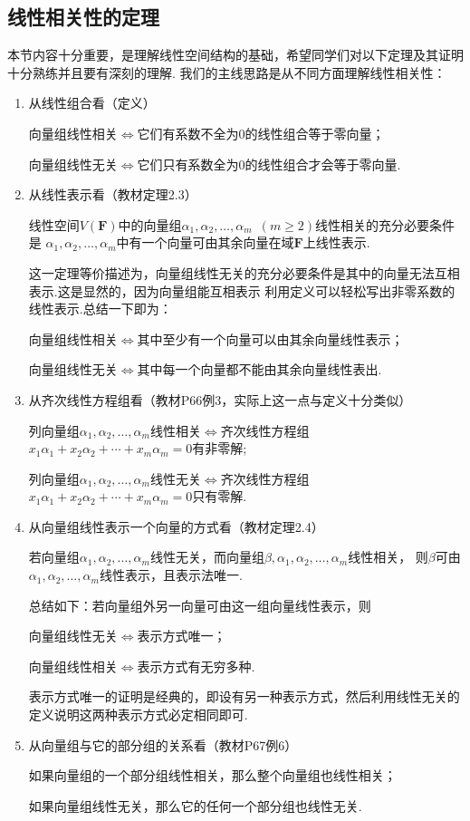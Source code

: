 \subsection{线性相关性的定理}
本节内容十分重要，是理解线性空间结构的基础，希望同学们对以下定理及其证明十分熟练并且要有深刻的理解.
我们的主线思路是从不同方面理解线性相关性：
\begin{enumerate}
    \item 从线性组合看（定义）

          向量组线性相关$\iff$它们有系数不全为0的线性组合等于零向量；

          向量组线性无关$\iff$它们只有系数全为0的线性组合才会等于零向量.
    \item 从线性表示看（教材定理2.3）
          \begin{theorem}
              线性空间$V(\mathbf{F})$中的向量组$\alpha_1,\alpha_2,\ldots,\alpha_m\enspace(m \geqslant 2)$线性相关的充分必要条件是
              $\alpha_1,\alpha_2,\ldots,\alpha_m$中有一个向量可由其余向量在域$\mathbf{F}$上线性表示.
          \end{theorem}
          这一定理等价描述为，向量组线性无关的充分必要条件是其中的向量无法互相表示.这是显然的，因为向量组能互相表示
          利用定义可以轻松写出非零系数的线性表示.总结一下即为：

          向量组线性相关$\iff$其中至少有一个向量可以由其余向量线性表示；

          向量组线性无关$\iff$其中每一个向量都不能由其余向量线性表出.
    \item 从齐次线性方程组看（教材P66例3，实际上这一点与定义十分类似）

          列向量组$\alpha_1,\alpha_2,\ldots,\alpha_m$线性相关$\iff$齐次线性方程组$x_1\alpha_1+x_2\alpha_2+\cdots+x_m\alpha_m=0$有非零解;

          列向量组$\alpha_1,\alpha_2,\ldots,\alpha_m$线性无关$\iff$齐次线性方程组$x_1\alpha_1+x_2\alpha_2+\cdots+x_m\alpha_m=0$只有零解.
    \item 从向量组线性表示一个向量的方式看（教材定理2.4）
          \begin{theorem}
              若向量组$\alpha_1,\alpha_2,\ldots,\alpha_m$线性无关，而向量组$\beta,\alpha_1,\alpha_2,\ldots,\alpha_m$线性相关，
              则$\beta$可由$\alpha_1,\alpha_2,\ldots,\alpha_m$线性表示，且表示法唯一.
          \end{theorem}
          总结如下：若向量组外另一向量可由这一组向量线性表示，则

          向量组线性无关$\iff$表示方式唯一；

          向量组线性相关$\iff$表示方式有无穷多种.

          表示方式唯一的证明是经典的，即设有另一种表示方式，然后利用线性无关的定义说明这两种表示方式必定相同即可.
    \item 从向量组与它的部分组的关系看（教材P67例6）

          如果向量组的一个部分组线性相关，那么整个向量组也线性相关；

          如果向量组线性无关，那么它的任何一个部分组也线性无关.
\end{enumerate}

